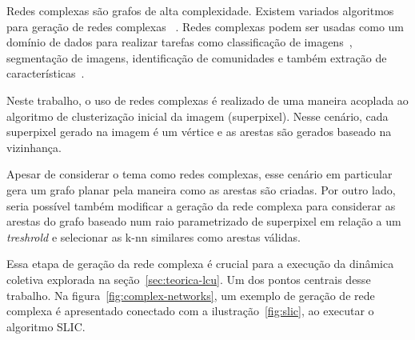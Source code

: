Redes complexas são grafos de alta complexidade. Existem variados
algoritmos para geração de redes complexas
~\cite{ComplexNetworksSurvey2007}. Redes complexas podem ser usadas
como um domínio de dados para realizar tarefas como classificação de
imagens~\cite{ComplexNetworksImageClassification2015}, segmentação de
imagens, identificação de comunidades e também extração de
características~\cite{JarbasComplexNetworks2020}.

Neste trabalho, o uso de redes complexas é realizado de uma maneira
acoplada ao algoritmo de clusterização inicial da imagem (superpixel). Nesse
cenário, cada superpixel gerado na imagem é um vértice e as arestas
são gerados baseado na vizinhança.

Apesar de considerar o tema como redes complexas, esse cenário em
particular gera um grafo planar pela maneira como as arestas são
criadas. Por outro lado, seria possível também modificar a geração da
rede complexa para considerar as arestas do grafo baseado num raio
parametrizado de superpixel em relação a um \textit{treshrold} e
selecionar as k-nn similares como arestas válidas.

Essa etapa de geração da rede complexa é crucial para a execução da
dinâmica coletiva explorada na seção~\ref{sec:teorica-lcu}. Um dos
pontos centrais desse trabalho. Na figura~\ref{fig:complex-networks},
um exemplo de geração de rede complexa é apresentado conectado com a
ilustração~\ref{fig:slic}, ao executar o algoritmo SLIC.\@

\begin{figure}[t]
        \captionsetup{width=12cm}
		\centering
\end{figure}
\FloatBarrier{}

